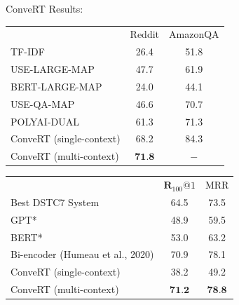 \documentclass{beamer}
\begin{document}
\begin{frame}{ConveRT}
Results:
\begin{center}\footnotesize
\begin{tabular}{lcc}
\hline & Reddit & AmazonQA \\
\cline { 2 - 3 } TF-IDF & 26.4 & 51.8 \\
USE-LARGE-MAP & 47.7 & 61.9 \\
BERT-LARGE-MAP & 24.0 & 44.1 \\
USE-QA-MAP & 46.6 & 70.7 \\
POLYAI-DUAL & 61.3 & 71.3 \\
\hline ConveRT (single-context) & 68.2 & 84.3 \\
ConveRT (multi-context) & $\mathbf{7 1 . 8}$ & $-$ \\
\hline
\end{tabular}
\end{center}

\begin{center}\footnotesize

    \begin{tabular}{lcc}
\hline & $\mathbf{R}_{100} @ 1$ & MRR \\
\cline { 2 - 3 } Best DSTC7 System & 64.5 & 73.5 \\
GPT* & 48.9 & 59.5 \\
BERT* & 53.0 & 63.2 \\
Bi-encoder (Humeau et al., 2020) & 70.9 & 78.1 \\
\hline ConveRT (single-context) & 38.2 & 49.2 \\
ConveRT (multi-context) & $\mathbf{7 1 . 2}$ & $\mathbf{7 8 . 8}$ \\
\hline
\end{tabular}
\end{center}

\end{frame}
\end{document}
